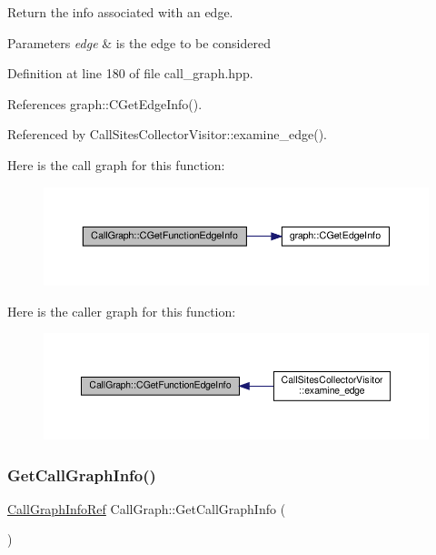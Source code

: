 Return the info associated with an edge. 


\begin{DoxyParams}{Parameters}
{\em edge} & is the edge to be considered \\
\hline
\end{DoxyParams}


Definition at line 180 of file call\+\_\+graph.\+hpp.



References graph\+::\+C\+Get\+Edge\+Info().



Referenced by Call\+Sites\+Collector\+Visitor\+::examine\+\_\+edge().

Here is the call graph for this function\+:
\nopagebreak
\begin{figure}[H]
\begin{center}
\leavevmode
\includegraphics[width=350pt]{d0/d52/classCallGraph_a0c702a72c5f2e9472f1d36f079861fe3_cgraph}
\end{center}
\end{figure}
Here is the caller graph for this function\+:
\nopagebreak
\begin{figure}[H]
\begin{center}
\leavevmode
\includegraphics[width=350pt]{d0/d52/classCallGraph_a0c702a72c5f2e9472f1d36f079861fe3_icgraph}
\end{center}
\end{figure}
\mbox{\label{classCallGraph_a211db8d8f8ff5698449bb0658ac22fd5}} 
\subsubsection{\texorpdfstring{Get\+Call\+Graph\+Info()}{GetCallGraphInfo()}}
{\footnotesize\ttfamily \hyperlink{call__graph_8hpp_a3259d849c69d9d111ec0c5178d9b32af}{Call\+Graph\+Info\+Ref} Call\+Graph\+::\+Get\+Call\+Graph\+Info (\begin{DoxyParamCaption}{ }\end{DoxyParamCaption})\hspace{0.3cm}{\ttfamily [inline]}}



